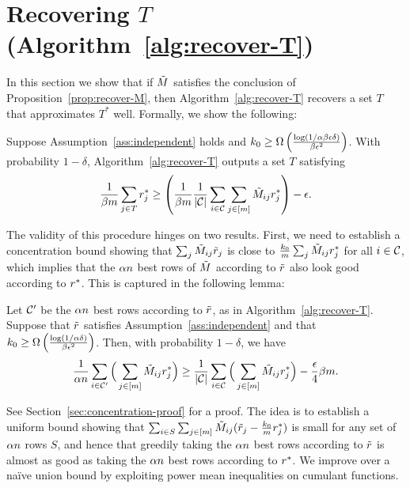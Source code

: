 \section{Recovering $T$ (Algorithm~\ref{alg:recover-T})}
\vskip -0.10in
\label{sec:approach-T}
\label{sec:rounding}

In this section we show that if $\tilde{M}$ satisfies the conclusion of 
Proposition~\ref{prop:recover-M}, then Algorithm~\ref{alg:recover-T} 
recovers a set $T$ that approximates $T^*$ well. Formally, we show 
the following:
\begin{proposition}
\label{prop:recover-T}
Suppose Assumption~\ref{ass:independent} holds and 
$k_0 \geq \Omega\left( \frac{\log(1/\alpha\beta\epsilon\delta)}{\beta\epsilon^2} \right)$. 
With probability $1-\delta$, Algorithm~\ref{alg:recover-T} outputs a set $T$ satisfying 
\begin{equation}
\label{eq:recover-T}
\frac{1}{\beta m}\sum_{j \in T} r^*_j \geq \left( \frac{1}{\beta m}\frac{1}{|\mathcal{C}|}\sum_{i \in \mathcal{C}} \sum_{j \in [m]} \tilde{M}_{ij}r^*_j \right) - \epsilon.
\end{equation}
\end{proposition}
The validity of this procedure hinges on two results. First, we need to establish 
a concentration bound showing that $\sum_j \tilde{M}_{ij}\tilde{r}_j$ is close to 
$\frac{k_0}{m}\sum_j \tilde{M}_{ij}r^*_j$ for all $i \in \mathcal{C}$, which implies that 
the $\alpha n$ best rows of $\tilde{M}$ according to $\tilde{r}$ also look good 
according to $r^*$. This is captured in the following lemma:
\begin{lemma}
\label{lem:robs-rtrue}
Let $\mathcal{C}'$ be the $\alpha n$ best rows according to $\tilde{r}$, as 
in Algorithm~\ref{alg:recover-T}. 
Suppose that $\tilde{r}$ satisfies Assumption~\ref{ass:independent} and that
$k_0 \geq \Omega\left( \frac{\log(1/\alpha\delta)}{\beta\epsilon^2} \right)$. 
Then, with probability $1-\delta$, we have
\begin{equation}
\label{eq:robs-rtrue}
\frac{1}{\alpha n} \sum_{i \in \mathcal{C}'} \Big(\sum_{j \in [m]} \tilde{M}_{ij}r^*_j\Big) \geq \frac{1}{|\mathcal{C}|} \sum_{i \in \mathcal{C}} \Big(\sum_{j \in [m]} \tilde{M}_{ij}r^*_j\Big) - \frac{\epsilon}{4}\beta m.
\end{equation}
\end{lemma}
See Section~\ref{sec:concentration-proof} for a proof.
The idea is to establish a uniform bound showing that 
$\sum_{i \in S} \sum_{j \in [m]} \tilde{M}_{ij}(\tilde{r}_j - \frac{k_0}{m}r^*_j)$ is small for any 
set of $\alpha n$ rows $S$, and hence that greedily taking the $\alpha n$ 
best rows according to $\tilde{r}$ is almost as good as taking the $\alpha n$ 
best rows according to $r^*$. We 
improve over a na\"{i}ve union bound by exploiting power mean 
inequalities on cumulant functions. 

